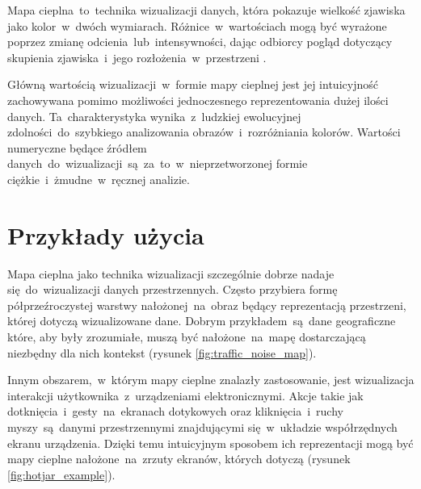 Mapa cieplna~to~technika wizualizacji danych, która pokazuje wielkość zjawiska jako kolor~w~dwóch wymiarach. Różnice~w~wartościach mogą być wyrażone poprzez zmianę odcienia~lub~intensywności, dając odbiorcy pogląd dotyczący skupienia zjawiska~i~jego rozłożenia~w~przestrzeni \cite{Heat_map_definition}.

Główną wartością wizualizacji~w~formie mapy cieplnej jest jej intuicyjność zachowywana pomimo możliwości jednoczesnego reprezentowania dużej ilości danych. Ta~charakterystyka wynika~z~ludzkiej ewolucyjnej zdolności~do~szybkiego analizowania obrazów~i~rozróżniania kolorów. Wartości numeryczne będące źródłem danych~do~wizualizacji~są~za~to~w~nieprzetworzonej formie ciężkie~i~żmudne~w~ręcznej analizie.

\section{Przykłady użycia}
Mapa cieplna jako technika wizualizacji szczególnie dobrze nadaje się~do~wizualizacji danych przestrzennych. Często przybiera formę półprzeźroczystej warstwy nałożonej~na~obraz będący reprezentacją przestrzeni, której dotyczą wizualizowane dane. Dobrym przykładem~są~dane geograficzne które, aby były zrozumiałe, muszą być nałożone~na~mapę dostarczającą niezbędny dla nich kontekst (rysunek \ref{fig:traffic_noise_map}).

\bigskip
{}

Innym obszarem,~w~którym mapy cieplne znalazły zastosowanie, jest wizualizacja interakcji użytkownika~z~urządzeniami elektronicznymi. Akcje takie jak dotknięcia~i~gesty~na~ekranach dotykowych oraz kliknięcia~i~ruchy myszy~są~danymi przestrzennymi znajdującymi się~w~układzie współrzędnych ekranu urządzenia. Dzięki temu intuicyjnym sposobem ich reprezentacji mogą być mapy cieplne nałożone~na~zrzuty ekranów, których dotyczą (rysunek \ref{fig:hotjar_example}).

\bigskip
{}
